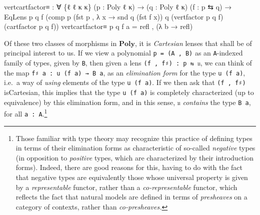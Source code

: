 \documentclass[
  11pt,
  oneside,
  article]{memoir}
\newenvironment{Shaded}{}{}
\newcommand{\NormalTok}[1]{#1}
\newcommand{\OtherTok}[1]{\textcolor[rgb]{0.00,0.44,0.13}{#1}}
\theoremstyle{definition}
\theoremstyle{plain}
\newcommand{\0}{\textsf{0}}
\newcommand{\1}{\tn{\textsf{1}}}
\begin{document}
\begin{Shaded}
\begin{Highlighting}[]
\NormalTok{vertcartfactor≡ }\OtherTok{:} \OtherTok{∀} \OtherTok{\{}\NormalTok{ℓ ℓ\textquotesingle{} κ κ\textquotesingle{}}\OtherTok{\}} \OtherTok{(}\NormalTok{p }\OtherTok{:}\NormalTok{ Poly ℓ κ}\OtherTok{)} 
                  \OtherTok{→} \OtherTok{(}\NormalTok{q }\OtherTok{:}\NormalTok{ Poly ℓ\textquotesingle{} κ\textquotesingle{}}\OtherTok{)} \OtherTok{(}\NormalTok{f }\OtherTok{:}\NormalTok{ p ⇆ q}\OtherTok{)}
                  \OtherTok{→}\NormalTok{ EqLens p q f}
                           \OtherTok{(}\NormalTok{comp p }\OtherTok{(}\NormalTok{fst p , }\OtherTok{λ}\NormalTok{ x }\OtherTok{→}\NormalTok{ snd q }\OtherTok{(}\NormalTok{fst f x}\OtherTok{))}\NormalTok{ q}
                                 \OtherTok{(}\NormalTok{vertfactor p q f}\OtherTok{)}
                                 \OtherTok{(}\NormalTok{cartfactor p q f}\OtherTok{))}
\NormalTok{vertcartfactor≡ p q f a }\OtherTok{=}\NormalTok{ refl , }\OtherTok{(λ}\NormalTok{ b }\OtherTok{→}\NormalTok{ refl}\OtherTok{)}
\end{Highlighting}
\end{Shaded}

Of these two classes of morphisms in \(\mathbf{Poly}\), it is
\emph{Cartesian} lenses that shall be of principal interest to us. If we
view a polynomial \texttt{p\ =\ (A\ ,\ B)} as an \texttt{A}-indexed
family of types, given by \texttt{B}, then given a lens
\texttt{(f\ ,\ f♯)\ :\ p\ ⇆\ 𝔲}, we can think of the map
\texttt{f♯\ a\ :\ u\ (f\ a)\ →\ B\ a}, as an \emph{elimination form} for
the type \texttt{u\ (f\ a)}, i.e.~a way of \emph{using} elements of the
type \texttt{u\ (f\ a)}. If we then ask that \texttt{(f\ ,\ f♯)}
isCartesian, this implies that the type \texttt{u\ (f\ a)} is completely
characterized (up to equivalence) by this elimination form, and in this
sense, \texttt{𝔲} \emph{contains} the type \texttt{B\ a}, for all
\texttt{a\ :\ A}.\footnote{Those familiar with type theory may recognize
  this practice of defining types in terms of their elimination forms as
  characteristic of so-called \emph{negative} types (in opposition to
  \emph{positive} types, which are characterized by their introduction
  forms). Indeed, there are good reasons for this, having to do with the
  fact that negative types are equivalently those whose universal
  property is given by a \emph{representable} functor, rather than a
  \emph{co-representable} functor, which reflects the fact that natural
  models are defined in terms of \emph{presheaves} on a category of
  contexts, rather than \emph{co-presheaves.}}
\end{document}
